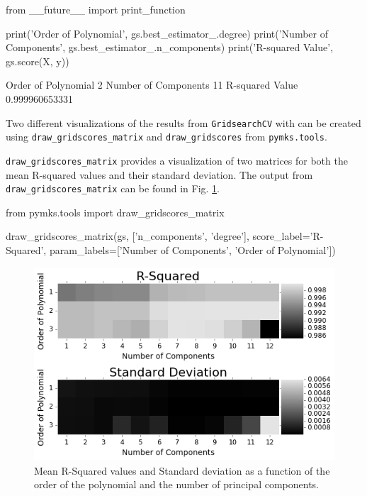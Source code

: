 \documentclass{bmcart}
\begin{document}
\begin{_input}
from __future__ import print_function

print('Order of Polynomial', gs.best_estimator_.degree)
print('Number of Components', gs.best_estimator_.n_components)
print('R-squared Value', gs.score(X, y))

\end{_input}
\begin{_output}
Order of Polynomial 2
Number of Components 11
R-squared Value 0.999960653331

\end{_output}


Two different visualizations of the results from \texttt{GridsearchCV}
with can be created using \texttt{draw\_gridscores\_matrix} and
\texttt{draw\_gridscores} from \texttt{pymks.tools}.

\texttt{draw\_gridscores\_matrix} provides a visualization of two
matrices for both the mean R-squared values and their standard
deviation. The output from \texttt{draw\_gridscores\_matrix} can be
found in Fig. \ref{fig:drawGridscoresMatrix}.


\begin{_input}
from pymks.tools import draw_gridscores_matrix

draw_gridscores_matrix(gs, ['n_components', 'degree'],
                       score_label='R-Squared',
                       param_labels=['Number of Components',
                                     'Order of Polynomial'])

\end{_input}



\begin{figure}
    \centering
    \includegraphics[scale=.64]{pymks_paper_homogenization_files/pymks_paper_homogenization_13_0.png}
    \caption{Mean R-Squared values and Standard deviation as a function of the order of the polynomial
    and the number of principal components.}
    \label{fig:drawGridscoresMatrix}
\end{figure}
\end{document}
